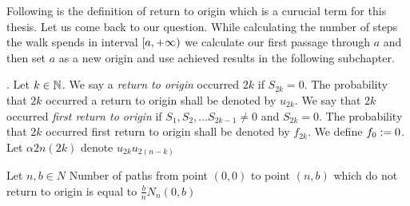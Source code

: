 \begin{rem}
  Following is the definition of return to origin which is a curucial term for this thesis.
  Let us come back to our question.
  While calculating the number of steps the walk spends in interval $[a,{+\infty})$ we calculate our first passage through $a$ and then set $a$ as a new origin and use achieved results in the following subchapter.
\end{rem}

\begin{defn}\label{defn-return_origin}
 \Lrw. Let $k \in \mathbb{N}$. We say a \emph{return to origin} occurred \intime $2k$ if $S_{2k}=0$. The probability that \intime $2k$ occurred a return to origin shall be denoted by $u_{2k}$.
 We say that \intime $2k$ occurred \emph{first return to origin} if $S_1, S_2, \ldots S_{2k-1}\neq 0$ and $S_{2k}=0$.
 The probability that \intime $2k$ occurred first return to origin shall be denoted by $f_{2k}$. We define $f_0 := 0$.
 Let $\alpha{2n} \left( 2k \right) $ denote $u_{2k}u_{2 \left( n-k \right) }$
\end{defn}
\begin{thm}\label{thm-ballot_theorem}
 Let $n,b \in N$
 Number of paths from point $ \left( 0,0 \right) $ to point $ \left( n,b \right) $ which do not return to origin is equal to $\frac{b}{n}N_n \left( 0,b \right) $
\end{thm}
